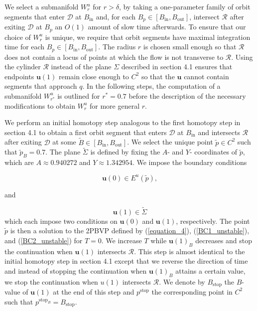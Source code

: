 \documentclass{ws-ijbc}
\begin{document}
We select a submanifold $W^u_r$ for $r>\delta$, by taking a one-parameter family of orbit segments that enter $\mathscr{D}$ at $B_{\mathrm{in}}$ and, for each $B_p \in [B_{\mathrm{in}}, B_{\mathrm{out}}]$, intersect $\mathscr{R}$ after exiting $\mathscr{D}$ at $B_p$ an $O(1)$ amount of slow time afterwards.  To ensure that our choice of $W^u_r$ is unique, we require that orbit segments have maximal integration time for each $B_p \in [B_{\mathrm{in}}, B_{\mathrm{out}}]$.  The radius $r$ is chosen small enough so that $\mathscr{R}$ does not contain a locus of points at which the flow is not transverse to $\mathscr{R}$.  Using the cylinder $\mathscr{R}$ instead of the plane $\Sigma$ described in section 4.1 ensures that endpoints $\mathbf{u}(1)$ remain close enough to $C^2$ so that the $\mathbf{u}$ cannot contain segments that approach $q$.  In the following steps, the computation of a submanifold $W^u_{r^*}$ is outlined for $r^*=0.7$ before the description of the necessary modifications to obtain $W^u_r$ for more general $r$. 

We perform an initial homotopy step analogous to the first homotopy step in section 4.1 to obtain a first orbit segment that enters $\mathscr{D}$ at $B_{\mathrm{in}}$ and intersects $\mathscr{R}$ after exiting $\mathscr{D}$ at some $\tilde{B} \in [B_{\mathrm{in}}, B_{\mathrm{out}}]$.  We select the unique point $\tilde{p} \in C^2$ such that $\tilde{p}_B=0.7$.  The plane $\tilde{\Sigma}$ is defined by fixing the $A$- and $Y$- coordinates of $\tilde{p}$, which are $A \approx 0.940272$ and $Y \approx 1.342954$.  We impose the boundary conditions

\begin{equation}
\mathbf{u}(0) \in E^u(\tilde{p}),
\label{BC1_unstable}
\end{equation}

\noindent
and 

\begin{equation}
\mathbf{u}(1) \in \tilde{\Sigma}
\label{BC2_unstable}
\end{equation}
\noindent
which each impose two conditions on $\mathbf{u}(0)$ and $\mathbf{u}(1)$, respectively.  The point $\tilde{p}$ is then a solution to the 2PBVP defined by (\ref{equation_4}), (\ref{BC1_unstable}), and (\ref{BC2_unstable}) for $T=0$.  We increase $T$ while $\mathbf{u}(1)_B$ decreases and stop the continuation when $\mathbf{u}(1)$ intersects $\mathscr{R}$.  This step is almost identical to the initial homotopy step in section 4.1 except that we reverse the direction of time and instead of stopping the continuation when $\mathbf{u}(1)_B$ attains a certain value, we stop the continuation when $u(1)$ intersects $\mathscr{R}$.  We denote by $B_{\mathrm{stop}}$ the $B$-value of $\mathbf{u}(1)$ at the end of this step and $p^{\text{stop}}$ the corresponding point in $C^2$ such that $p^{\text{stop}_B}=B_{\text{stop}}$.
\end{document}
